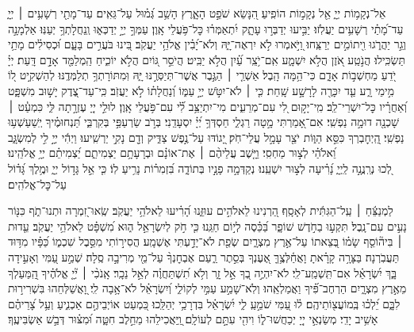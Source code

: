 \documentclass[twoside, openany, parskip=half, 11pt]{book}
\begin{document}
{
\begin{narrow}
אֵל־נְקָמ֥וֹת יְיָ֑ אֵ֖ל נְקָמ֣וֹת הוֹפִֽיעַ׃
הִ֭נָּשֵׂא שֹׁפֵ֣ט הָאָ֑רֶץ הָשֵׁ֥ב גְּ֝מ֗וּל עַל־גֵּאִֽים׃
עַד־מָתַ֖י רְשָׁעִ֥ים ׀ יְיָ֑ עַד־מָ֝תַ֗י רְשָׁעִ֥ים יַעֲלֹֽזוּ׃
יַבִּ֣יעוּ יְדַבְּר֣וּ עָתָ֑ק יִ֝תְאַמְּר֗וּ כׇּל־פֹּ֥עֲלֵי אָֽוֶן׃
עַמְּךָ֣ יְיָ֣ יְדַכְּא֑וּ וְֽנַחֲלָתְךָ֥ יְעַנּֽוּ׃
אַלְמָנָ֣ה וְגֵ֣ר יַהֲרֹ֑גוּ וִ֖יתוֹמִ֣ים יְרַצֵּֽחוּ׃
וַ֭יֹּ֣אמְרוּ לֹ֣א יִרְאֶה־יָּ֑הּ וְלֹא־יָ֝בִ֗ין אֱלֹהֵ֥י יַעֲקֹֽב׃
בִּ֭ינוּ בֹּעֲרִ֣ים בָּעָ֑ם וּ֝כְסִילִ֗ים מָתַ֥י תַּשְׂכִּֽילוּ׃
הֲנֹ֣טַֽע אֹ֭זֶן הֲלֹ֣א יִשְׁמָ֑ע אִֽם־יֹ֥צֵֽר עַ֗֝יִן הֲלֹ֣א יַבִּֽיט׃
הֲיֹסֵ֣ר גּ֭וֹיִם הֲלֹ֣א יוֹכִ֑יחַ הַֽמְלַמֵּ֖ד אָדָ֣ם דָּֽעַת׃
יְיָ֗ יֹ֭דֵעַ מַחְשְׁב֣וֹת אָדָ֑ם כִּי־הֵ֥מָּה הָֽבֶל׃
אַשְׁרֵ֤י ׀ הַגֶּ֣בֶר אֲשֶׁר־תְּיַסְּרֶ֣נּוּ יָּ֑הּ וּֽמִתּוֹרָתְךָ֥ תְלַמְּדֶֽנּוּ׃
לְהַשְׁקִ֣יט ל֭וֹ מִ֣ימֵי רָ֑ע עַ֤ד יִכָּרֶ֖ה לָרָשָׁ֣ע שָֽׁחַת׃
כִּ֤י ׀ לֹא־יִטֹּ֣שׁ יְיָ֣ עַמּ֑וֹ וְ֝נַחֲלָת֗וֹ לֹ֣א יַעֲזֹֽב׃
כִּֽי־עַד־צֶ֭דֶק יָשׁ֣וּב מִשְׁפָּ֑ט וְ֝אַחֲרָ֗יו כׇּל־יִשְׁרֵי־לֵֽב׃
מִֽי־יָק֣וּם לִ֭י עִם־מְרֵעִ֑ים מִי־יִתְיַצֵּ֥ב לִ֗֝י עִם־פֹּ֥עֲלֵי אָֽוֶן׃
לוּלֵ֣י יְיָ֭ עֶזְרָ֣תָה לִּ֑י כִּמְעַ֓ט ׀ שָׁכְנָ֖ה דוּמָ֣ה נַפְשִֽׁי׃
אִם־אָ֭מַרְתִּי מָ֣טָה רַגְלִ֑י חַסְדְּךָ֥ יְ֝יָ֗ יִסְעָדֵֽנִי׃
בְּרֹ֣ב שַׂרְעַפַּ֣י בְּקִרְבִּ֑י תַּ֝נְחוּמֶ֗יךָ יְֽשַׁעַשְׁע֥וּ נַפְשִֽׁי׃
הַֽ֭יְחׇבְרְךָ כִּסֵּ֣א הַוּ֑וֹת יֹצֵ֖ר עָמָ֣ל עֲלֵי־חֹֽק׃
יָ֭גוֹדּוּ עַל־נֶ֣פֶשׁ צַדִּ֑יק וְדָ֖ם נָקִ֣י יַרְשִֽׁיעוּ׃
וַיְהִ֬י יְיָ֣ לִ֣י לְמִשְׂגָּ֑ב וֵ֝אלֹהַ֗י לְצ֣וּר מַחְסִֽי׃
וַיָּ֤שֶׁב עֲלֵיהֶ֨ם ׀ אֶת־אוֹנָ֗ם וּבְרָעָתָ֥ם יַצְמִיתֵ֑ם יַ֝צְמִיתֵ֗ם יְיָ֥ אֱלֹהֵֽינוּ׃\\


לְ֭כוּ נְרַֽנֲנָ֣ה לַֽיְיָ֑ נָ֝רִ֗יעָה לְצ֣וּר יִשְׁעֵֽנוּ׃ נְקַדְּמָ֣ה פָנָ֣יו בְּתוֹדָ֑ה בִּ֝זְמִר֗וֹת נָרִ֥יעַ לֽוֹ׃ כִּ֤י אֵ֣ל גָּד֣וֹל יְיָ֑ וּמֶ֥לֶךְ גָּ֝ד֗וֹל עַל־כׇּל־אֱלֹהִֽים׃
\end{narrow}

\begin{narrow}
לַמְנַצֵּ֬חַ ׀ עַֽל־הַגִּתִּ֬ית לְאָסָֽף׃
הַ֭רְנִינוּ לֵאלֹהִ֣ים עוּזֵּ֑נוּ הָ֝רִ֗יעוּ לֵאלֹהֵ֥י יַעֲקֹֽב׃
שְֽׂאוּ־זִ֭מְרָה וּתְנוּ־תֹ֑ף כִּנּ֖וֹר נָעִ֣ים עִם־נָֽבֶל׃
תִּקְע֣וּ בַחֹ֣דֶשׁ שׁוֹפָ֑ר בַּ֝כֵּ֗סֶה לְי֣וֹם חַגֵּֽנוּ׃
כִּ֤י חֹ֣ק לְיִשְׂרָאֵ֣ל ה֑וּא מִ֝שְׁפָּ֗ט לֵאלֹהֵ֥י יַעֲקֹֽב׃
עֵ֤דוּת ׀ בִּיה֘וֹסֵ֤ף שָׂמ֗וֹ בְּ֭צֵאתוֹ עַל־אֶ֣רֶץ מִצְרָ֑יִם שְׂפַ֖ת לֹא־יָדַ֣עְתִּי אֶשְׁמָֽע׃
הֲסִיר֣וֹתִי מִסֵּ֣בֶל שִׁכְמ֑וֹ כַּ֝פָּ֗יו מִדּ֥וּד תַּעֲבֹֽרְנָה׃
בַּצָּרָ֥ה קָרָ֗אתָ וָאֲחַ֫לְּצֶ֥ךָּ אֶ֭עֶנְךָ בְּסֵ֣תֶר רַ֑עַם אֶבְחׇנְךָ֨ עַל־מֵ֖י מְרִיבָ֣ה סֶֽלָה׃
שְׁמַ֣ע עַ֭מִּי וְאָעִ֣ידָה בָּ֑ךְ יִ֝שְׂרָאֵ֗ל אִם־תִּֽשְׁמַֽע־לִֽי׃
לֹא־יִהְיֶ֣ה בְ֭ךָ אֵ֣ל זָ֑ר וְלֹ֥א תִ֝שְׁתַּחֲוֶ֗ה לְאֵ֣ל נֵכָֽר׃
אָֽנֹכִ֨י ׀ יְ֘יָ֤ אֱלֹהֶ֗יךָ הַֽ֭מַּעַלְךָ מֵאֶ֣רֶץ מִצְרָ֑יִם הַרְחֶב־פִּ֗֝יךָ וַאֲמַלְאֵֽהוּ׃
וְלֹֽא־שָׁמַ֣ע עַמִּ֣י לְקוֹלִ֑י וְ֝יִשְׂרָאֵ֗ל לֹא־אָ֥בָה לִֽי׃
וָ֭אֲשַׁלְּחֵהוּ בִּשְׁרִיר֣וּת לִבָּ֑ם יֵ֝לְכ֗וּ בְּֽמוֹעֲצ֖וֹתֵיהֶֽם׃
ל֗וּ עַ֭מִּי שֹׁמֵ֣עַֽ לִ֑י יִ֝שְׂרָאֵ֗ל בִּדְרָכַ֥י יְהַלֵּֽכוּ׃
כִּ֭מְעַט אוֹיְבֵיהֶ֣ם אַכְנִ֑יעַ וְעַ֥ל צָ֝רֵיהֶ֗ם אָשִׁ֥יב יָדִֽי׃
מְשַׂנְאֵ֣י יְיָ֭ יְכַחֲשׁוּ־ל֑וֹ וִיהִ֖י עִתָּ֣ם לְעוֹלָֽם׃
וַֽ֭יַּאֲכִילֵהוּ מֵחֵ֣לֶב חִטָּ֑ה וּ֝מִצּ֗וּר דְּבַ֣שׁ אַשְׂבִּיעֶֽךָ׃
\end{narrow}

}
\end{document}
